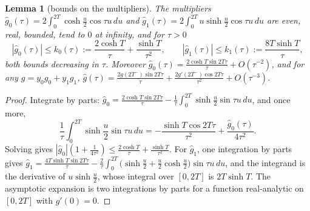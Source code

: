 \documentclass[10pt]{amsart}
\newtheorem{lemma}[theorem]{Lemma}
\theoremstyle{definition}
\theoremstyle{remark}
\newcommand{\gh}[1]{\widehat g_{#1}}
\begin{document}
\begin{lemma}[bounds on the multipliers]\label{lem:gbounds}
The multipliers $\gh0(\tau)=2\int_0^{2T}\cosh\frac u2\cos\tau u\,du$ and $\gh1(\tau)=2\int_0^{2T}u\sinh\frac u2\cos\tau u\,du$
are even, real, bounded, tend to $0$ at infinity, and for $\tau>0$
\[
|\gh0(\tau)|\le k_0(\tau):=\frac{2\cosh T}{\tau}+\frac{\sinh T}{\tau^2},\qquad
|\gh1(\tau)|\le k_1(\tau):=\frac{8T\sinh T}{\tau},
\]
both bounds decreasing in $\tau$. Moreover $\gh0(\tau)=\frac{2\cosh T\sin2T\tau}{\tau}+O(\tau^{-2})$,
and for any $g=y_0g_0+y_1g_1$, $\widehat g(\tau)=\frac{2g(2T^-)\sin2T\tau}{\tau}+\frac{2g'(2T^-)\cos2T\tau}{\tau^2}+O(\tau^{-3})$.
\end{lemma}
\begin{proof}
Integrate by parts: $\gh0=\frac{2\cosh T\sin2T\tau}\tau-\frac1\tau\int_0^{2T}\sinh\frac u2\sin\tau u\,du$,
and once more,
\[\frac1\tau\int_0^{2T}\sinh\frac u2\sin\tau u\,du=-\frac{\sinh T\cos2T\tau}{\tau^2}+\frac{\gh0(\tau)}{4\tau^2}.\]
Solving gives $|\gh0|(1+\frac1{4\tau^2})\le\frac{2\cosh T}\tau+\frac{\sinh T}{\tau^2}$. For $\gh1$, one
integration by parts gives $\gh1=\frac{4T\sinh T\sin2T\tau}{\tau}-\frac2\tau\int_0^{2T}\big(\sinh\frac u2+\frac u2\cosh\frac u2\big)\sin\tau u\,du$,
and the integrand is the derivative of $u\sinh\frac u2$, whose integral over $[0,2T]$ is $2T\sinh T$.
The asymptotic expansion is two integrations by parts for a function real-analytic on $[0,2T]$
with $g'(0)=0$.
\end{proof}
\end{document}
